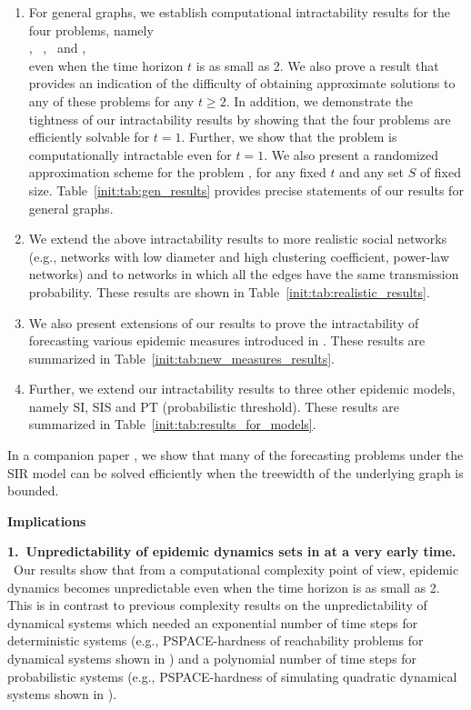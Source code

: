\begin{enumerate}
\item For general graphs, we establish computational intractability results for
the four problems, namely \\
\tNewInfs,~ \tTotInfs,~ \tVuls{} and \tTotVuls,\\
even when the time horizon $t$ is as small as 2.
We also prove a result that provides an indication of the difficulty
of obtaining approximate solutions to any of these problems
for any $t \geq 2$.
In addition, we demonstrate the tightness of our intractability results 
by showing that the
four problems are efficiently solvable for $t = 1$.
Further, we show that the \tPeak{} problem is computationally
intractable even for $t = 1$.
We also present a randomized approximation scheme for the problem
\tTotVuls, for any fixed $t$ and any set $S$ of fixed size.
Table~\ref{init:tab:gen_results} provides precise statements of
our results for general graphs.

\item We extend the above intractability results to more
realistic social networks (e.g., networks with low diameter and
high clustering coefficient, power-law networks) and to networks
in which all the edges have the same transmission probability.
These results are shown in Table~\ref{init:tab:realistic_results}.

\item We also present extensions of our results to prove the intractability
of forecasting various epidemic measures introduced in \cite{TC+2016}.
These results are summarized in Table~\ref{init:tab:new_measures_results}.

\item Further, we extend our intractability results to
three other epidemic models, namely SI, SIS and PT
(probabilistic threshold).
These results are summarized in Table~\ref{init:tab:results_for_models}.
\end{enumerate}
In a companion paper \cite{Rosenkrantz_etal_2016}, we show that
many of the forecasting problems under the SIR model can be solved efficiently
when the treewidth \cite{Bod93} of the underlying graph is bounded.




\clearpage

\noindent
{\Large\textbf{Implications}}

\medskip\smallskip

\noindent
\textbf{1.~Unpredictability of epidemic dynamics sets in at a very early time.} \ 
Our results show that from a computational complexity point of view, 
epidemic dynamics becomes unpredictable even when the 
time horizon is as small as 2.
This is in contrast to previous complexity results on the unpredictability
of dynamical systems which needed an exponential number of time steps for
deterministic systems (e.g., PSPACE-hardness of reachability problems
for dynamical systems shown in \cite{BH+06}) and a polynomial number of time
steps for probabilistic systems (e.g., PSPACE-hardness of simulating 
quadratic dynamical systems shown in \cite{Arora-etal-1994}).

